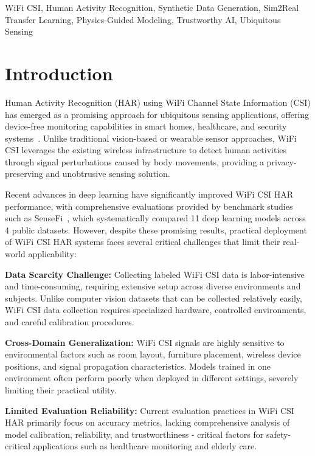 \documentclass[journal]{IEEEtran}
\begin{document}
\begin{IEEEkeywords}
WiFi CSI, Human Activity Recognition, Synthetic Data Generation, Sim2Real Transfer Learning, Physics-Guided Modeling, Trustworthy AI, Ubiquitous Sensing
\end{IEEEkeywords}

\section{Introduction}

Human Activity Recognition (HAR) using WiFi Channel State Information (CSI) has emerged as a promising approach for ubiquitous sensing applications, offering device-free monitoring capabilities in smart homes, healthcare, and security systems~\cite{reference1}. Unlike traditional vision-based or wearable sensor approaches, WiFi CSI leverages the existing wireless infrastructure to detect human activities through signal perturbations caused by body movements, providing a privacy-preserving and unobtrusive sensing solution.

Recent advances in deep learning have significantly improved WiFi CSI HAR performance, with comprehensive evaluations provided by benchmark studies such as SenseFi~\cite{yang2023sensefi}, which systematically compared 11 deep learning models across 4 public datasets. However, despite these promising results, practical deployment of WiFi CSI HAR systems faces several critical challenges that limit their real-world applicability:

\textbf{Data Scarcity Challenge:} Collecting labeled WiFi CSI data is labor-intensive and time-consuming, requiring extensive setup across diverse environments and subjects. Unlike computer vision datasets that can be collected relatively easily, WiFi CSI data collection requires specialized hardware, controlled environments, and careful calibration procedures.

\textbf{Cross-Domain Generalization:} WiFi CSI signals are highly sensitive to environmental factors such as room layout, furniture placement, wireless device positions, and signal propagation characteristics. Models trained in one environment often perform poorly when deployed in different settings, severely limiting their practical utility.

\textbf{Limited Evaluation Reliability:} Current evaluation practices in WiFi CSI HAR primarily focus on accuracy metrics, lacking comprehensive analysis of model calibration, reliability, and trustworthiness - critical factors for safety-critical applications such as healthcare monitoring and elderly care.
\end{document}
